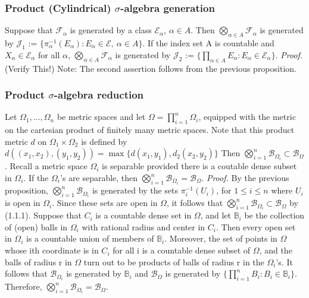 \documentclass{article}
\begin{document}
\subsubsection{Product (Cylindrical) $\sigma$-algebra generation}
Suppose that $\mathcal{F}_{\alpha}$ is generated by a class $\mathcal{E}_{\alpha}$, $\alpha \in A$. Then $\bigotimes_{\alpha \in A}\mathcal{F}_{\alpha}$ is generated by $\mathcal{J}_1$ := $\{\pi^{-1}_{\alpha}(E_{\alpha}):E_{\alpha}\in \mathcal{E},\ \alpha \in A \}$. If the index set A is countable and $X_{\alpha}\in \mathcal{E}_{\alpha}$ for all $\alpha$, $\bigotimes_{\alpha \in A} \mathcal{F}_{\alpha}$ is generated by $\mathcal{J}_2$ := $\{\prod_{\alpha \in A}E_{\alpha}:E_{\alpha} \in \mathcal{E}_{\alpha} \}.$\newline \newline
\textit{Proof.}\newline \newline
(Verify This!)\newline \newline
Note: The second assertion follows from the previous proposition.

\subsubsection{Product $\sigma$-algebra reduction}
Let $\Omega_1,\ldots,\Omega_n$ be metric spaces and let $\Omega=\prod_{i=1}^n\Omega_i$, equipped with the metric on the cartesian product of finitely many metric spaces. Note that this product metric $d$ on $\Omega_1 \times \Omega_2$ is defined by $d((x_1,x_2), (y_1, y_2))=\max\{d(x_1,y_1), d_2(x_2, y_2)\}$ Then $\bigotimes_{i=1}^n\mathcal{B}_{\Omega_i}\subset\mathcal{B}_{\Omega}$. Recall a metric space $\Omega_i$ is separable provided there is a coutable dense subset in $\Omega_i$. If the $\Omega_i$'s are separable, then $\bigotimes_{i=1}^n\mathcal{B}_{\Omega_i}= \mathcal{B}_{\Omega}$.\newline \newline
\textit{Proof.}\newline \newline
By the previous proposition, $\bigotimes_{i=1}^n\mathcal{B}_{\Omega_i}$ is generated by the sets $\pi_i^{-1}(U_i)$, for $1\leq i \leq n$ where $U_i$ is open in $\Omega_i$. Since these sets are open in $\Omega$, it follows that  $\bigotimes_{i=1}^n\mathcal{B}_{\Omega_i}\subset\mathcal{B}_{\Omega}$ by (1.1.1). Suppose that $C_i$ is a countable dense set in $\Omega$, and let $\mathbb{B}_i$ be the collection of (open) balls in $\Omega_i$ with rational radius and center in $C_i$. Then every open set in $\Omega_i$ is a countable union of members of $\mathbb{B}_i$. Moreover, the set of points in $\Omega$ whose ith coordinate is in $C_i$ for all i is a countable dense subset of $\Omega$, and the balls of radius r in $\Omega$ turn out to be products of balls of radius r in the $\Omega_i$'s. It follows that $\mathcal{B}_{\Omega_i}$ is generated by $\mathbb{B}_i$ and $\mathcal{B}_{\Omega}$ is generated by $\{\prod_{i=1}^nB_i:B_i\in\mathbb{B}_i\}$. Therefore, $\bigotimes_{i=1}^n\mathcal{B}_{\Omega_i}=\mathcal{B}_{\Omega}$.
\end{document}
